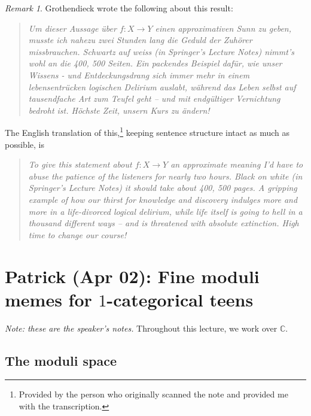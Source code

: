 \documentclass[leqno, openany]{memoir}
\theoremstyle{definition}
\theoremstyle{remark}
\newtheorem{rmk}[thm]{Remark}
\theoremstyle{plain}
\theoremstyle{definition}
\theoremstyle{remark}
\newcommand{\C}{\mathbb{C}}
\begin{document}
\begin{rmk} Grothendieck wrote the following about this result:
    \begin{quotation} \textit{Um dieser Aussage \"uber $f \colon X \to Y$ einen
        approximativen Sunn zu geben, musste ich nahezu zwei Stunden lang die
    Geduld der Zuh\"orer missbrauchen. Schwartz auf weiss (in Springer's
Lecture Notes) nimmt's wohl an die 400, 500 Seiten. Ein packendes Beispiel
daf\"ur, wie unser Wissens - und Entdeckungsdrang sich immer mehr in einem
lebensentr\"ucken logischen Delirium auslabt, w\"ahrend das Leben selbst auf
tausendfache Art zum Teufel geht -- und mit endg\"ultiger Vernichtung bedroht
ist. H\"ochste Zeit, unsern Kurs zu \"andern!} \end{quotation} The English
translation of this,\footnote{Provided by the person who originally scanned the
note and provided me with the transcription.} keeping sentence structure intact
as much as possible, is \begin{quotation} \textit{To give this statement about
    $f \colon X \to Y$ an approximate meaning I'd have to abuse the patience of
the listeners for nearly two hours. Black on white (in Springer's Lecture
Notes) it should take about 400, 500 pages. A gripping example of how our
thirst for knowledge and discovery indulges more and more in a life-divorced
logical delirium, while life itself is going to hell in a thousand different
ways -- and is threatened with absolute extinction. High time to change our
course!} \end{quotation} \end{rmk}

\chapter{Patrick (Apr 02): Fine moduli memes for $1$-categorical teens}%
\label{cha:patrick_apr_02_}

\textit{Note: these are the speaker's notes.} Throughout this lecture, we work
over $\C$.

\section{The moduli space}%
\end{document}
